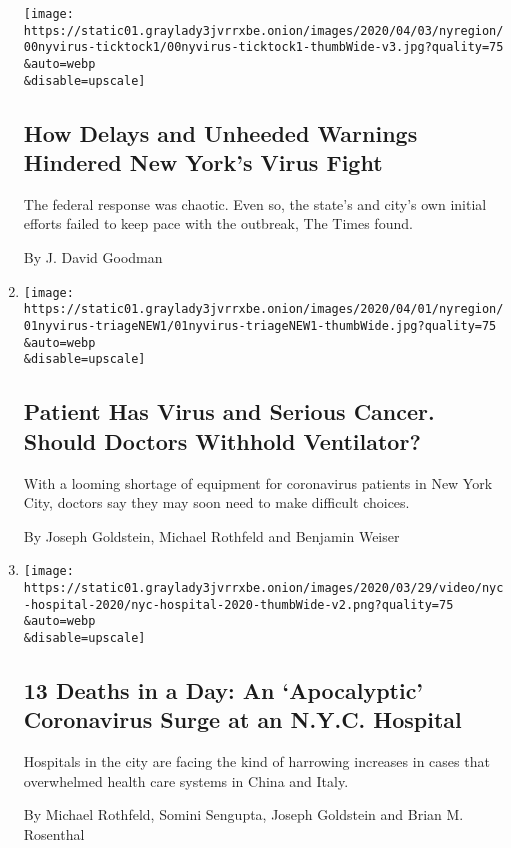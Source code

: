 \begin{enumerate}
  \texttt{[image: https://static01.graylady3jvrrxbe.onion/images/2020/04/03/nyregion/00nyvirus-ticktock1/00nyvirus-ticktock1-thumbWide-v3.jpg?quality=75\\\&auto=webp\\\&disable=upscale]}

  \hypertarget{how-delays-and-unheeded-warnings-hindered-new-yorks-virus-fight}{%
  \subsection{How Delays and Unheeded Warnings Hindered New York's Virus
  Fight}\label{how-delays-and-unheeded-warnings-hindered-new-yorks-virus-fight}}

  The federal response was chaotic. Even so, the state's and city's own
  initial efforts failed to keep pace with the outbreak, The Times
  found.

  By J. David Goodman
\item
  \href{/2020/04/01/nyregion/coronavirus-doctors-patients.html}{}

  \texttt{[image: https://static01.graylady3jvrrxbe.onion/images/2020/04/01/nyregion/01nyvirus-triageNEW1/01nyvirus-triageNEW1-thumbWide.jpg?quality=75\\\&auto=webp\\\&disable=upscale]}

  \hypertarget{patient-has-virus-and-serious-cancer-should-doctors-withhold-ventilator}{%
  \subsection{Patient Has Virus and Serious Cancer. Should Doctors
  Withhold
  Ventilator?}\label{patient-has-virus-and-serious-cancer-should-doctors-withhold-ventilator}}

  With a looming shortage of equipment for coronavirus patients in New
  York City, doctors say they may soon need to make difficult choices.

  By Joseph Goldstein, Michael Rothfeld and Benjamin Weiser
\item
  \href{/2020/03/25/nyregion/nyc-coronavirus-hospitals.html}{}

  \texttt{[image: https://static01.graylady3jvrrxbe.onion/images/2020/03/29/video/nyc-hospital-2020/nyc-hospital-2020-thumbWide-v2.png?quality=75\\\&auto=webp\\\&disable=upscale]}

  \hypertarget{13-deaths-in-a-day-an-apocalyptic-coronavirus-surge-at-an-nyc-hospital}{%
  \subsection{13 Deaths in a Day: An `Apocalyptic' Coronavirus Surge at
  an N.Y.C.
  Hospital}\label{13-deaths-in-a-day-an-apocalyptic-coronavirus-surge-at-an-nyc-hospital}}

  Hospitals in the city are facing the kind of harrowing increases in
  cases that overwhelmed health care systems in China and Italy.

  By Michael Rothfeld, Somini Sengupta, Joseph Goldstein and Brian M.
  Rosenthal
\end{enumerate}

